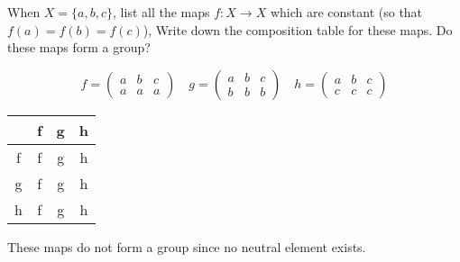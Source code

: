 \begin{exercise}
    When \(X = \{a, b, c\}\), list all the maps \(f : X \to X\) which are constant (so that \(f(a) = f(b) = f(c)\)), Write down the composition table for these maps. Do these maps form a group?
\end{exercise}
\begin{solution}
    \[f = \begin{pmatrix} a & b & c \\ a & a & a \end{pmatrix} \quad g = \begin{pmatrix} a & b & c \\ b & b & b \end{pmatrix} \quad h = \begin{pmatrix} a & b & c \\ c & c & c \end{pmatrix}\]

    \begin{center}
        \begin{tabular}{C|C|C|C}
              & f & g & h \\ \hline
            f & f & g & h \\
            g & f & g & h \\
            h & f & g & h
        \end{tabular}
    \end{center}

    These maps do not form a group since no neutral element exists.
\end{solution}

